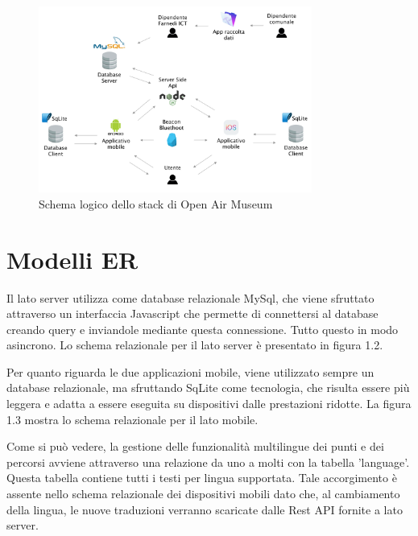 \begin{figure}[h]
\centering
\includegraphics[width=0.8\textwidth]{images/SchemaOpenAirMuseum.png}
\caption{Schema logico dello stack di Open Air Museum}
\end{figure}

\section{Modelli ER}\vspace{5mm}
		
	Il lato server utilizza come database relazionale MySql, che viene sfruttato attraverso un interfaccia Javascript che permette di connettersi al database creando query e inviandole mediante questa connessione. Tutto questo in modo asincrono. Lo schema relazionale per il lato server è presentato in figura 1.2.\vspace{5mm}
	
	Per quanto riguarda le due applicazioni mobile, viene utilizzato sempre un database relazionale, ma sfruttando SqLite come tecnologia, che risulta essere più leggera e adatta a essere eseguita su dispositivi dalle prestazioni ridotte. La figura 1.3 mostra lo schema relazionale per il lato mobile.\vspace{5mm}

Come si può vedere, la gestione delle funzionalità multilingue dei punti e dei percorsi avviene attraverso una relazione da uno a molti con la tabella 'language'. Questa tabella contiene tutti i testi per lingua supportata. Tale accorgimento è assente nello schema relazionale dei dispositivi mobili dato che, al cambiamento della lingua, le nuove traduzioni verranno scaricate dalle Rest API fornite a lato server.



